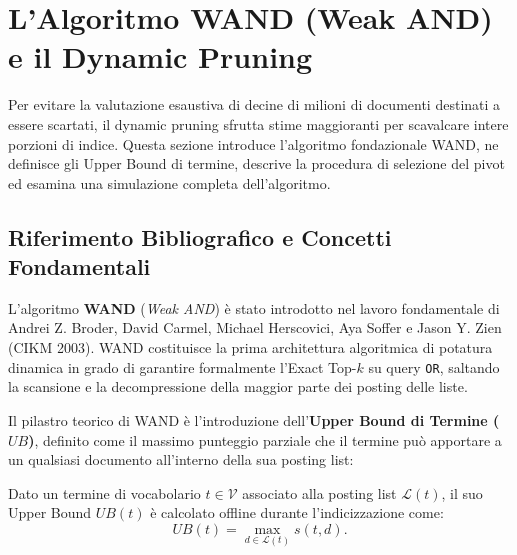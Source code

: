 \FloatBarrier
\section{L'Algoritmo WAND (Weak AND) e il Dynamic Pruning}
\label{sec:algoritmo-wand}

Per evitare la valutazione esaustiva di decine di milioni di documenti destinati a essere scartati, il dynamic pruning sfrutta stime maggioranti per scavalcare intere porzioni di indice. Questa sezione introduce l'algoritmo fondazionale WAND, ne definisce gli Upper Bound di termine, descrive la procedura di selezione del pivot ed esamina una simulazione completa dell'algoritmo.

\FloatBarrier
\subsection{Riferimento Bibliografico e Concetti Fondamentali}
\label{subsec:wand-riferimento-concetti}
L'algoritmo \textbf{WAND} (\textit{Weak AND}) \`e stato introdotto nel lavoro fondamentale di Andrei Z. Broder, David Carmel, Michael Herscovici, Aya Soffer e Jason Y. Zien~\cite{broder2003} (CIKM 2003). WAND costituisce la prima architettura algoritmica di potatura dinamica in grado di garantire formalmente l'Exact Top-$k$ su query \texttt{OR}, saltando la scansione e la decompressione della maggior parte dei posting delle liste.

Il pilastro teorico di WAND \`e l'introduzione dell'\textbf{Upper Bound di Termine ($UB$)}, definito come il massimo punteggio parziale che il termine pu\`o apportare a un qualsiasi documento all'interno della sua posting list:
\begin{definition}
Dato un termine di vocabolario $t \in \mathcal{V}$ associato alla posting list $\mathcal{L}(t)$, il suo Upper Bound $UB(t)$ \`e calcolato offline durante l'indicizzazione come:
\begin{equation}
    UB(t) = \max_{d \in \mathcal{L}(t)} s(t, d).
    \label{eq:term-upper-bound}
\end{equation}
\end{definition}

